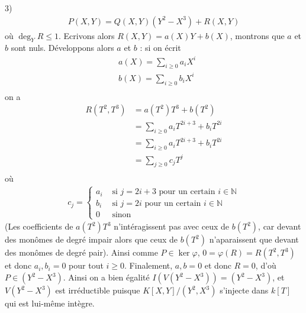 \documentclass[11pt]{article}
\begin{document}
\begin{question}{3)}
        \begin{align*}
            P(X,Y) = Q(X,Y)(Y^2 - X^3) + R(X,Y)
        \end{align*}
        où $\deg_Y R \leq 1$. Ecrivons alors $R(X,Y) = a(X)Y + b(X)$, montrons que $a$ et $b$ sont nuls. Développons alors $a$ et $b$ : si on écrit 
        \begin{align*}
            &a(X) = \sum_{i \geq 0} a_i X^i \\
            &b(X) = \sum_{i \geq 0} b_i X^i \\
        \end{align*}
        on a 
        \begin{align*}
            R(T^2, T^3) &= a(T^2)T^3 + b(T^2) \\
            &= \sum_{i \geq 0} a_i T^{2i + 3} + b_i T^{2i} \\
            &= \sum_{i \geq 0} a_i T^{2i + 3} + b_i T^{2i} \\
            &= \sum_{j \geq 0} c_j T^j \\
        \end{align*}
        où
        \begin{align*}
            c_j =
            \begin{cases}
                a_i &\text{ si } j = 2i + 3 \text{ pour un certain } i \in \mathbb{N} \\
                b_i &\text{ si } j = 2i \text{ pour un certain } i \in \mathbb{N} \\
                0 & \text{ sinon}
            \end{cases}
        \end{align*}
        (Les coefficients de $a(T^2)T^3$ n'intéragissent pas avec ceux de $b(T^2)$, car devant des monômes de degré impair alors que ceux de $b(T^2)$ n'aparaissent que devant des monômes de degré pair). Ainsi comme $P \in \ker \varphi$, $0 = \varphi(R) = R(T^2, T^3)$ et donc $a_i, b_i = 0$ pour tout $i \geq 0$. Finalement, $a,b = 0$ et donc $R = 0$, d'où $P \in (Y^2 - X^3)$. Ainsi on a bien égalité $I(V(Y^2 - X^3)) = (Y^2 - X^3)$, et $V(Y^2 - X^3)$ est irréductible puisque $K[X,Y]/(Y^2 , X^3)$ s'injecte dans $k[T]$ qui est lui-même intègre.
    \end{question}
\end{document}
